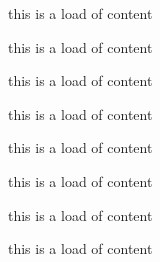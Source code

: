   this is a load of content
  
  this is a load of content
  
  this is a load of content
  
  this is a load of content
  
  this is a load of content
  
  this is a load of content
  
  this is a load of content
  
  this is a load of content
  
  \begin{figure}
    \centering

\end{figure}
